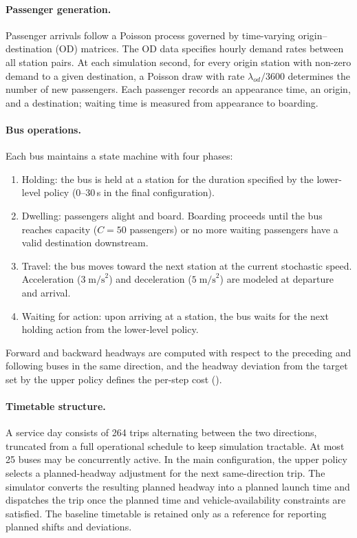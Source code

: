 \paragraph{Passenger generation.}
Passenger arrivals follow a Poisson process governed by time-varying origin--destination (OD) matrices.
The OD data specifies hourly demand rates between all station pairs.
At each simulation second, for every origin station with non-zero demand to a given destination, a Poisson draw with rate $\lambda_{od}/3600$ determines the number of new passengers.
Each passenger records an appearance time, an origin, and a destination; waiting time is measured from appearance to boarding.

\paragraph{Bus operations.}
Each bus maintains a state machine with four phases:
\begin{enumerate}
  \item Holding: the bus is held at a station for the duration specified by the lower-level policy (0--30\,s in the final configuration).
  \item Dwelling: passengers alight and board. Boarding proceeds until the bus reaches capacity ($C = 50$ passengers) or no more waiting passengers have a valid destination downstream.
  \item Travel: the bus moves toward the next station at the current stochastic speed. Acceleration ($3\;\text{m/s}^2$) and deceleration ($5\;\text{m/s}^2$) are modeled at departure and arrival.
  \item Waiting for action: upon arriving at a station, the bus waits for the next holding action from the lower-level policy.
\end{enumerate}
Forward and backward headways are computed with respect to the preceding and following buses in the same direction, and the headway deviation from the target set by the upper policy defines the per-step cost ().

\paragraph{Timetable structure.}
A service day consists of 264 trips alternating between the two directions, truncated from a full operational schedule to keep simulation tractable.
At most 25 buses may be concurrently active.
In the main configuration, the upper policy selects a planned-headway adjustment for the next same-direction trip. The simulator converts the resulting planned headway into a planned launch time and dispatches the trip once the planned time and vehicle-availability constraints are satisfied. The baseline timetable is retained only as a reference for reporting planned shifts and deviations.

